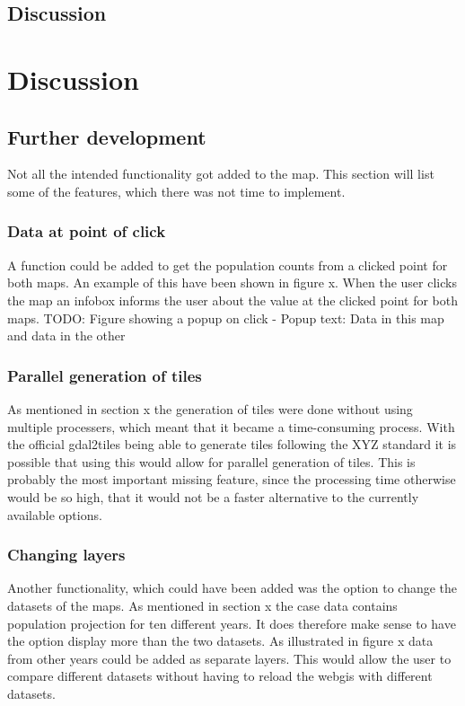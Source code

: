 \section{Discussion}
\chapter{Discussion}
\section{Further development}
Not all the intended functionality got added to the map. This section will list some of the features, which there was not time to implement. 

\subsection{Data at point of click}

A function could be added to get the population counts from a clicked point for both maps. An example of this have been shown in figure x. When the user clicks the map an infobox informs the user about the value at the clicked point for both maps. 
TODO: Figure showing a popup on click
-	Popup text: Data in this map and data in the other



\subsection{Parallel generation of tiles}
As mentioned in section x the generation of tiles were done without using multiple processers, which meant that it became a time-consuming process. With the official gdal2tiles being able to generate tiles following the XYZ standard it is possible that using this would allow for parallel generation of tiles. 
This is probably the most important missing feature, since the processing time otherwise would be so high, that it would not be a faster alternative to the currently available options. 

\subsection{Changing layers}
Another functionality, which could have been added was the option to change the datasets of the maps. As mentioned in section x the case data contains population projection for ten different years. It does therefore make sense to have the option display more than the two datasets.  As illustrated in figure x data from other years could be added as separate layers. This would allow the user to compare different datasets without having to reload the webgis with different datasets.

